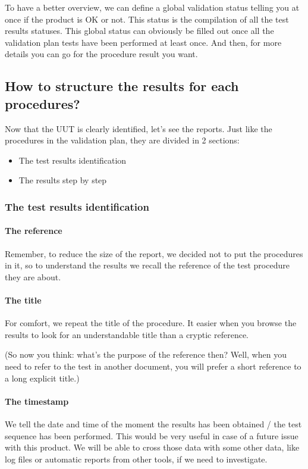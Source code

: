 To have a better overview, we can define a global validation status telling you at once if the product is OK or not. This status is the compilation of all the test results statuses. This global status can obviously be filled out once all the validation plan tests have been performed at least once. And then, for more details you can go for the procedure result you want.

\subsection{How to structure the results for each procedures?}
Now that the UUT is clearly identified, let’s see the reports. Just like the procedures in the validation plan, they are divided in 2 sections:

\begin{itemize}
    \item The test results identification
    \item The results step by step
\end{itemize}

\subsubsection{The test results identification}

\paragraph{The reference}
Remember, to reduce the size of the report, we decided not to put the procedures in it, so to understand the results we recall the reference of the test procedure they are about.

\paragraph{The title}
For comfort, we repeat the title of the procedure. It easier when you browse the results to look for an understandable title than a cryptic reference.

(So now you think: what’s the purpose of the reference then? Well, when you need to refer to the test in another document, you will prefer a short reference to a long explicit title.)

\paragraph{The timestamp}
We tell the date and time of the moment the results has been obtained / the test sequence has been performed. This would be very useful in case of a future issue with this product. We will be able to cross those data with some other data, like log files or automatic reports from other tools, if we need to investigate.

